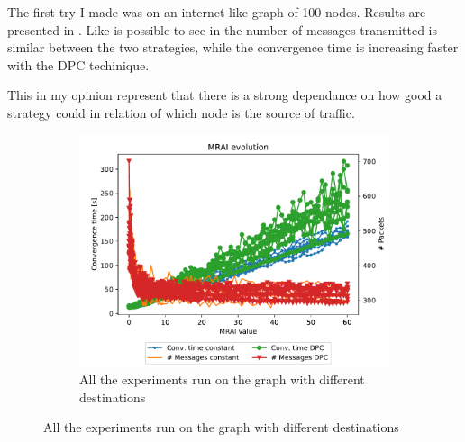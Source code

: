\documentclass[10pt,conference,letterpaper]{IEEEtran}
\newcommand{\figwidth}{0.78}
\begin{document}
The first try I made was on an internet like graph of \num{100} nodes.
Results are presented in .
Like is possible to see in  the number
of messages transmitted is similar between the two strategies, while the convergence
time is increasing faster with the \ac{DPC} techinique.

This in my opinion represent that there is a strong dependance on how good
a strategy could in relation of which node is the source of traffic.

\begin{figure}[tb]
	\centering

	\begin{subfigure}{\columnwidth}
		\centering
		\includegraphics[width=\figwidth\columnwidth]{images/internet_like/S_AW/different_destinations_all.pdf}
		\caption{All the experiments run on the graph with different destinations}
		\label{fig:s_aw_different_desintations_all}
		\qquad
	\end{subfigure}


\end{figure}
\end{document}
